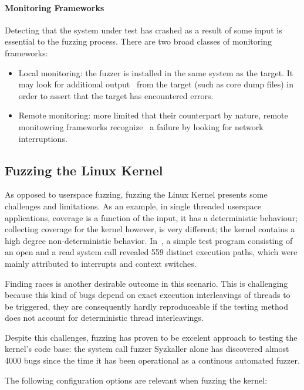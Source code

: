 \paragraph{Monitoring Frameworks}

Detecting that the system under test has crashed as a result of some input is essential to the fuzzing process.
There are two broad classes of monitoring frameworks\cite{mcnallyFuzzingStateArt2012}:

\begin{itemize}
    \item Local monitoring: the fuzzer is installed in the same system as the target. It may look for additional output \
    from the target (such as core dump files) in order to assert that the target has encountered errors.
    \item Remote monitoring: more limited that their counterpart by nature, remote monitowring frameworks recognize \
    a failure by looking for network interruptions.
\end{itemize}
\subsection{Fuzzing the Linux Kernel}\label{ss:fuzzingkernel}

As opposed to userspace fuzzing, fuzzing the Linux Kernel
presents some challenges and limitations. As an example, in single threaded
userspace applications, coverage is a function of the input, it has a
deterministic behaviour; collecting coverage for the kernel however, is
very different;  the kernel contains a high degree
non-deterministic behavior. In~\cite{okechInvestigatingExecutionPath2013}, a
simple test program consisting of an open and a read system call revealed
559 distinct execution paths, which were mainly attributed to interrupts and context switches.

Finding races is another desirable outcome in this scenario. This is
challenging because this kind of bugs depend on exact
execution interleavings of threads to be triggered, they are consequently hardly reproduceable if the testing method does not account for deterministic
thread interleavings.

Despite this challenges, fuzzing has proven to be excelent approach to testing the
kernel's code base: the system call fuzzer Syzkaller alone has discovered
almost  4000 bugs since the time it has been operational as a continous
automated fuzzer\cite{Syzbot}.

The following configuration options are relevant when fuzzing the kernel:

